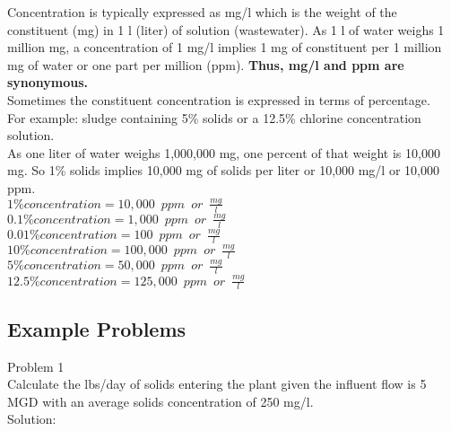 Concentration is typically expressed as mg/l which is the weight of the constituent (mg) in 1 l (liter) of solution (wastewater).  As 1 l of water weighs 1 million mg, a concentration of 1 mg/l implies 1 mg of constituent per 1 million mg of water or one part per million (ppm).   \textbf{Thus, mg/l and ppm are synonymous.}\\  
Sometimes the constituent concentration is expressed in terms of percentage.\\
\vspace{6pt}
For example:  sludge containing 5\% solids or a 12.5\% chlorine concentration solution.\\
\vspace{6pt}
As one liter of water weighs 1,000,000 mg, one percent of that weight is 10,000 mg.  So 1\% solids implies 10,000 mg of solids per liter or 10,000 mg/l or 10,000 ppm.\\
\vspace{6pt}
$1\% concentration = 10,000 \enspace ppm \enspace or \enspace\frac{mg}{l}$\\
$0.1\% concentration = 1,000 \enspace ppm \enspace or \enspace \frac{mg}{l}$\\
$0.01\% concentration = 100 \enspace ppm \enspace or \enspace \frac{mg}{l}$\\
$10\% concentration = 100,000 \enspace ppm \enspace or \enspace \frac{mg}{l}$\\
$5\% concentration = 50,000 \enspace ppm \enspace or \enspace \frac{mg}{l}$\\
$12.5\% concentration = 125,000 \enspace ppm \enspace or \enspace \frac{mg}{l}$

\subsection{Example Problems}

Problem 1\\Calculate the lbs/day of solids entering the plant given the influent flow is 5 MGD with an average solids concentration  of 250 mg/l.\\

Solution:\\

